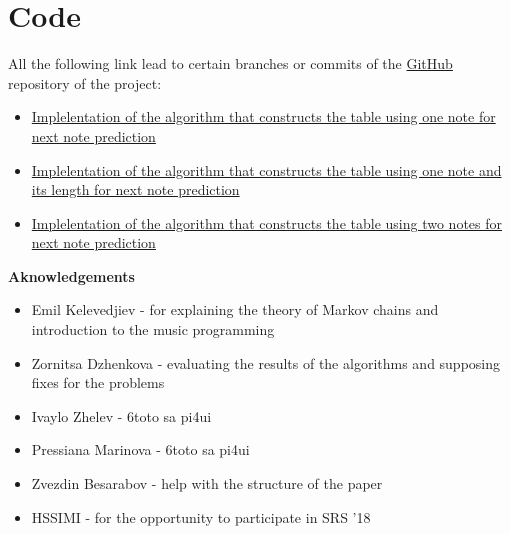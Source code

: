 \documentclass[]{article}
\begin{document}
    \section{Code}
        All the following link lead to certain branches or commits of the \href{https://github.com}{GitHub} repository of the project:
        \begin{itemize}
            \item \href{https://github.com/Ro6afF/compmus/tree/0cf9173a547a9effdc720dc6f6ac8ad551cd2fa4}{Implelentation of the algorithm that constructs the table using one note for next note prediction}
            \item \href{https://github.com/Ro6afF/compmus/tree/One_note_with_time}{Implelentation of the algorithm that constructs the table using one note and its length for next note prediction}
            \item \href{https://github.com/Ro6afF/compmus/tree/72fbc777ef7371ac7810d87d306ba3a2e8267121}{Implelentation of the algorithm that constructs the table using two notes for next note prediction}
        \end{itemize}
        \newpage
    {\large{\textbf{Aknowledgements}}}
    \begin{itemize}
        \item Emil Kelevedjiev - for explaining the theory of Markov chains and introduction to the music programming
        \item Zornitsa Dzhenkova - evaluating the results of the algorithms and supposing fixes for the problems
        \item Ivaylo Zhelev - 6toto sa pi4ui
        \item Pressiana Marinova - 6toto sa pi4ui
        \item Zvezdin Besarabov - help with the structure of the paper
        \item HSSIMI - for the opportunity to participate in SRS '18
    {}
    

    \end{itemize}
\end{document}
